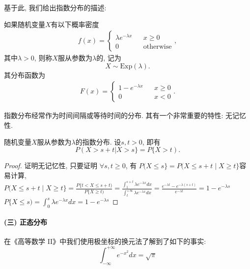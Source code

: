 基于此, 我们给出指数分布的描述:
\begin{definition}
    如果随机变量$X$有以下概率密度
    \begin{align*}
        f(x)=\left\{\begin{array}{lcl}
                        \lambda e^{-\lambda x} &  & x\ge 0           \\
                        0                      &  & \mbox{otherwise}
                    \end{array}\right. ,
    \end{align*}
    其中$\lambda>0$, 则称$X$服从参数为$\lambda$的, 记为
    \[X\sim \text{Exp}(\lambda). \]
    其分布函数为
    \begin{align*}
        F(x)=\left\{\begin{array}{lcl}
                        1- e^{-\lambda x} &  & x\ge 0 \\
                        0                 &  & x<0
                    \end{array}\right. .
    \end{align*}
\end{definition}

指数分布经常作为时间间隔或等待时间的分布. 其有一个非常重要的特性: 无记忆性.

\begin{proposition}
    随机变量$X$服从参数为$\lambda$的指数分布. 设$s,t>0$, 即有
    \[ P(X>s+t|X>s\}=P\{X>t).\]
\end{proposition}

\begin{proof}
    证明无记忆性, 只要证明 $\forall s, t \geq 0$, 有 $P(X \leq s\}=P(X \leq s+t \mid X \geq t\}$容易计算, $P(X \leq s+t \mid X \geq t\}=\frac{P\{t<X \leq s+t)}{P\{X \geq t)}=\frac{\int_1^{s+t} \lambda e^{-\lambda x} d x}{\int_t^{+\infty} \lambda e^{-\lambda x} d x}=\frac{e^{-\lambda t}-e^{-\lambda(s+t)}}{e^{-\lambda t}}=1-e^{-\lambda s}$ $P\{X \leq s)=\int_0^s \lambda e^{-\lambda x} d x=1-e^{-\lambda s}$
\end{proof}

\paragraph{(三) 正态分布}

在《高等数学 II》中我们使用极坐标的换元法了解到了如下的事实:
$$
    \int_{-\infty}^{+\infty}e^{-x^2} dx =\sqrt \pi
$$

